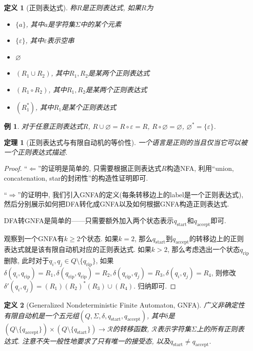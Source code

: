 \documentclass[8pt]{article}
\theoremstyle{compact}
\newtheorem{theorem}{定理}
\newtheorem{definition}{定义}
\newtheorem{example}{例}
\def\ge{\geqslant}
\begin{document}
\begin{definition}[正则表达式]
	称$R$是正则表达式, 如果$R$为
	\begin{itemize}
		\item $\{a\}$, 其中$a$是字符集$\Sigma$中的某个元素
		\item $\{\varepsilon\}$, 其中$\varepsilon$表示空串
		\item $\varnothing$
		\item $(R_1 \cup R_2)$, 其中$R_1, R_2$是某两个正则表达式
		\item $(R_1 \circ R_2)$, 其中$R_1, R_2$是某两个正则表达式
		\item $(R_1^*)$, 其中$R_1$是某个正则表达式
	\end{itemize}
\end{definition}
\begin{example}
	对于任意正则表达式$R$, $R \cup \varnothing = R \circ \varepsilon = R$, $R \circ \varnothing = \varnothing$, $\varnothing^* = \{\varepsilon\}$. 
\end{example}
\begin{theorem}[正则表达式与有限自动机的等价性]
	一个语言是正则的当且仅当它可以被一个正则表达式描述. 
\end{theorem}
\begin{proof}
	“$\Leftarrow$”的证明是简单的, 只需要根据正则表达式$R$构造NFA, 利用“union, concatenation, star的封闭性”的构造性证明即可. 

	“$\Rightarrow$”的证明中, 我们引入GNFA的定义(每条转移边上的label是一个正则表达式), 然后分别展示如何把DFA转化成GNFA以及如何根据GNFA构造正则表达式. 

	DFA转GNFA是简单的——只需要额外加入两个状态表示$q_{\text{start}}$和$q_{\text{accept}}$即可. 

	观察到一个GNFA有$k \ge 2$个状态. 如果$k=2$, 那么$q_{\text{start}}$到$q_{\text{accept}}$的转移边上的正则表达式就是该有限自动机对应的正则表达式. 如果$k > 2$, 那么考虑选出一个状态$q_{\text{rip}}$删除, 此时对于$q_i, q_j \in Q \setminus \{q_{\text{rip}}\}$, 如果$\delta(q_i,  q_{\text{rip}}) = R_1, \delta(q_{\text{rip}}, q_{\text{rip}}) = R_2, \delta(q_{\text{rip}}, q_j) = R_3, \delta(q_i, q_j) = R_4$, 则修改$\delta'(q_i, q_j) = (R_1)(R_2)^*(R_3) \cup (R_4)$. 归纳即可. 
\end{proof}
\begin{definition}[Generalized Nondeterministic Finite Automaton, GNFA]
	广义非确定性有限自动机是一个五元组$(Q, \Sigma, \delta, q_{\text{start}}, q_{\text{accept}})$, 其中$\delta$是$(Q \setminus \{q_{\text{accept}}\}) \times (Q \setminus \{q_{\text{start}}\}) \to \mathcal R$的转移函数, $\mathcal R$表示字符集$\Sigma$上的所有正则表达式. 注意不失一般性地要求了只有唯一的接受态, 以及$q_{\text{start}} \neq q_{\text{accept}}$. 
\end{definition}
\end{document}
